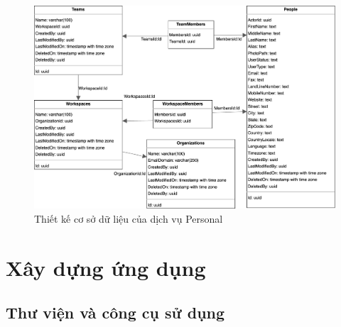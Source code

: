\documentclass[../DoAn.tex]{subfiles}
\begin{document}
\begin{figure}[H]
    \centering
    \includegraphics[width=1.1\linewidth]{Hinhve/PersonalDbDiagram.png}
    \caption{Thiết kế cơ sở dữ liệu của dịch vụ Personal}
    \label{fig:PersonalDbDiagram}
\end{figure}

\section{Xây dựng ứng dụng}
\label{section:4.3}
\subsection{Thư viện và công cụ sử dụng}
\label{subsection:4.3.1}
\end{document}
